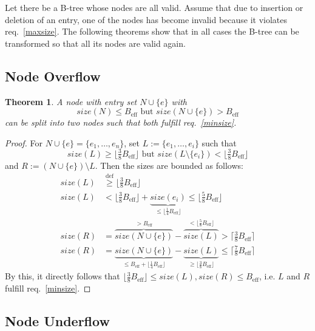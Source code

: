 \documentclass{vldb}
\newtheorem{thm}{Theorem}
\newcommand \Beff { B_{\text{eff}} }
\begin{document}
Let there be a B-tree whose nodes are all valid.
Assume that due to insertion or deletion of an entry, one of the nodes has
become invalid because it violates req.~\ref{maxsize}.
The following theorems show that in all cases the B-tree can
be transformed so that all its nodes are valid again.


\subsection*{Node Overflow}

\begin{thm}
A node with entry set \mbox{$N \cup \{ e \}$} with
\[ size(N) \leq \Beff \text{ but } size(N \cup \{e\}) > \Beff \]
can be split into two nodes such that both fulfill req.~\ref{minsize}.
\end{thm}

\begin{proof}
For \mbox{$N \cup \{e\} = \{ e_1, \ldots, e_n \}$}, set
\mbox{$L := \{ e_1, \ldots, e_i \}$} such that
\[ size(L) \geq \lfloor \tfrac{3}{8} \Beff \rfloor \text{ but }
    size(L \setminus \{e_i\}) < \lfloor \tfrac{3}{8} \Beff \rfloor \]
and \mbox{$R := (N \cup \{e\}) \setminus L$}.
Then the sizes are bounded as follows:
\begin{align*}
size(L) &\stackrel{\mathrm{def}}{\geq} \lfloor \tfrac{3}{8} \Beff \rfloor\\
size(L) &< \lfloor \tfrac{3}{8} \Beff \rfloor
        + \underbrace{size(e_i)}_{\leq \lfloor \frac{1}{4} \Beff \rfloor}
    \leq \lfloor \tfrac{5}{8} \Beff \rfloor\\
size(R) &= \overbrace{size(N \cup \{e\})}^{> \Beff}
        - \overbrace{size(L)}^{< \lfloor \frac{5}{8} \Beff \rfloor}
    > \lceil \tfrac{3}{8} \Beff \rceil\\
size(R) &= \underbrace{size(N \cup \{e\})}_{
            \leq \Beff + \lfloor \frac{1}{4} \Beff \rfloor}
        - \underbrace{size(L)}_{\geq \lfloor \frac{3}{8} \Beff \rfloor}
    \leq \lceil \tfrac{7}{8} \Beff \rceil
\end{align*}
By this, it directly follows that 
\mbox{$\lfloor \tfrac{3}{8} \Beff \rfloor \leq size(L), size(R) \leq \Beff$}, 
i.e.  $L$ and $R$ fulfill req.~\ref{minsize}.
\end{proof}


\subsection*{Node Underflow}
\end{document}
